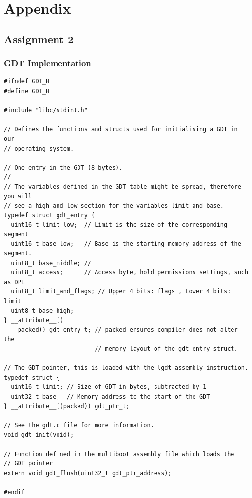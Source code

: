 \documentclass[../main.tex]{subfiles}
\begin{document}
\section{Appendix}
\label{sect:appendix}


\subsection{Assignment 2 }
\label{apx:assignment_2_}


\subsubsection{GDT Implementation}
\label{apx:gdt_implementation}


\begin{listing}[H]
    \begin{verbatim}
#ifndef GDT_H
#define GDT_H

#include "libc/stdint.h"

// Defines the functions and structs used for initialising a GDT in our
// operating system.

// One entry in the GDT (8 bytes).
//
// The variables defined in the GDT table might be spread, therefore you will
// see a high and low section for the variables limit and base.
typedef struct gdt_entry {
  uint16_t limit_low;  // Limit is the size of the corresponding segment
  uint16_t base_low;   // Base is the starting memory address of the segment.
  uint8_t base_middle; //
  uint8_t access;      // Access byte, hold permissions settings, such as DPL
  uint8_t limit_and_flags; // Upper 4 bits: flags , Lower 4 bits: limit
  uint8_t base_high;
} __attribute__((
    packed)) gdt_entry_t; // packed ensures compiler does not alter the
                          // memory layout of the gdt_entry struct.

// The GDT pointer, this is loaded with the lgdt assembly instruction.
typedef struct {
  uint16_t limit; // Size of GDT in bytes, subtracted by 1
  uint32_t base;  // Memory address to the start of the GDT
} __attribute__((packed)) gdt_ptr_t;

// See the gdt.c file for more information.
void gdt_init(void);

// Function defined in the multiboot assembly file which loads the
// GDT pointer
extern void gdt_flush(uint32_t gdt_ptr_address);

#endif
    \end{verbatim}
    \caption{Implementation of \texttt{gdt.h}}
    \label{lst:gdt_h}
\end{listing}
\end{document}
